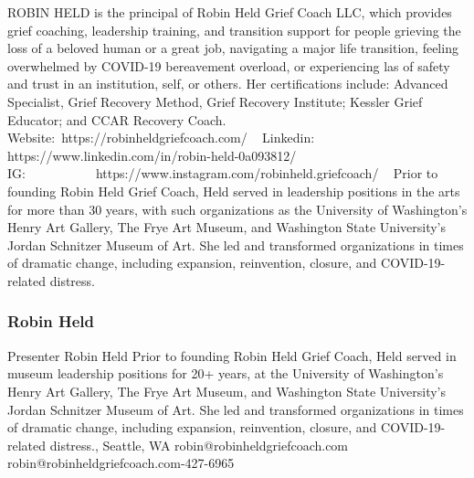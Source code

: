 \documentclass{report}
\begin{document}
              ROBIN HELD is the principal of Robin Held Grief Coach LLC, which provides grief coaching, leadership training, and transition support for people grieving the loss of a beloved human or a great job, navigating a major life transition, feeling overwhelmed by COVID-19 bereavement overload, or experiencing las of safety and trust in an institution, self, or others. Her certifications include: Advanced Specialist, Grief Recovery Method, Grief Recovery Institute; Kessler Grief Educator; and CCAR Recovery Coach.
 
Website: https://robinheldgriefcoach.com/
 
Linkedin: https://www.linkedin.com/in/robin-held-0a093812/
 
IG:           https://www.instagram.com/robinheld.griefcoach/
 
Prior to founding Robin Held Grief Coach, Held served in leadership positions in the arts for more than 30 years, with such organizations as the University of Washington’s Henry Art Gallery, The Frye Art Museum, and Washington State University’s Jordan Schnitzer Museum of Art. She led and transformed organizations in times of dramatic change, including expansion, reinvention, closure, and COVID-19-related distress.\newline


              

              
                \subsubsection*{ Robin Held }
                Presenter\newline
                Robin Held\newline
                Prior to founding Robin Held Grief Coach, Held served in museum leadership positions for 20+ years, at the University of Washington’s Henry Art Gallery, The Frye Art Museum, and Washington State University’s Jordan Schnitzer Museum of Art. She led and transformed organizations in times of dramatic change, including expansion, reinvention, closure, and COVID-19-related distress., Seattle, WA
                \newline
                robin@robinheldgriefcoach.com\newline
                robin@robinheldgriefcoach.com-427-6965\newline
\end{document}
